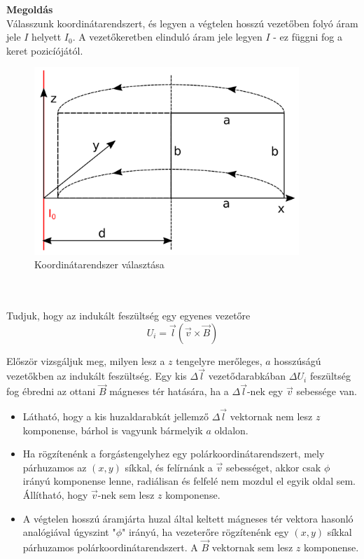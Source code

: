 \documentclass[11pt,a4paper,openany,leqno]{article}
\begin{document}
\textbf{Megoldás}\\
\indent
Válasszunk koordinátarendszert, és legyen a végtelen hosszú vezetőben folyó áram jele $I$ helyett $I_0$. A vezetőkeretben elinduló áram jele legyen $I$ - ez függni fog a keret pozicíójától.\\ 
\begin{figure}[h!]
\centering
  \includegraphics[width=100mm,scale=0.5]{kep2.pdf}
  \caption{Koordinátarendszer választása}
  \label{}
\end{figure} \\ \\
\indent 
Tudjuk, hogy az indukált feszültség egy egyenes vezetőre\\ 
$$ U_i = \vec{l} (\vec{v}\times\vec{B}) $$ \indent

Először vizsgáljuk meg, milyen lesz a $z$ tengelyre merőleges, $a$ hosszúságú vezetőkben az indukált feszültség. Egy kis $\Delta \vec{l}$ vezetődarabkában $\Delta U_i$ feszültség fog ébredni az ottani $\vec{B}$ mágneses tér hatására, ha a $\Delta \vec{l}$-nek egy $\vec{v}$ sebessége van.

\begin{itemize}
  \item Látható, hogy a kis huzaldarabkát jellemző $\Delta \vec{l}$ vektornak nem lesz $z$ komponense, bárhol is vagyunk bármelyik $a$ oldalon.
  \item Ha rögzítenénk a forgástengelyhez egy polárkoordinátarendszert, mely párhuzamos az $(x,y)$ síkkal, és felírnánk a $\vec{v}$ sebességet, akkor csak $\phi$ irányú komponense lenne, radiálisan és felfelé nem mozdul el egyik oldal sem. Állítható, hogy $\vec{v}$-nek sem lesz $z$ komponense. 
  \item A végtelen hosszú áramjárta huzal által keltett mágneses tér vektora hasonló analógiával úgyszint "$\phi$" irányú, ha vezeterőre rögzítenénk egy $(x,y)$ síkkal párhuzamos polárkoordinátarendszert. A $\vec{B}$ vektornak sem lesz $z$ komponense.
\end{itemize} 
\end{document}
